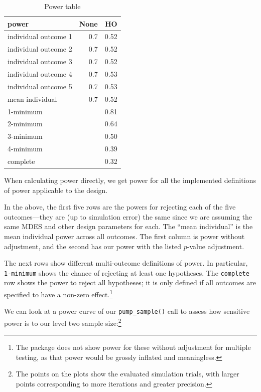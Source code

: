 \documentclass{article}
\begin{document}
\begin{table}[h!]

\caption{\label{tab:unnamed-chunk-7}Power table}
\centering
\begin{tabular}[t]{lrr}
\toprule
power & None & HO\\
\midrule
individual outcome 1 & 0.7 & 0.52\\
individual outcome 2 & 0.7 & 0.52\\
individual outcome 3 & 0.7 & 0.52\\
individual outcome 4 & 0.7 & 0.53\\
individual outcome 5 & 0.7 & 0.53\\
\addlinespace
mean individual & 0.7 & 0.52\\
1-minimum &  & 0.81\\
2-minimum &  & 0.64\\
3-minimum &  & 0.50\\
4-minimum &  & 0.39\\
\addlinespace
complete &  & 0.32\\
\bottomrule
\end{tabular}
\end{table}

When calculating power directly, we get power for all the implemented
definitions of power applicable to the design.

In the above, the first five rows are the powers for rejecting each of
the five outcomes---they are (up to simulation error) the same since we
are assuming the same MDES and other design parameters for each. The
``mean individual'' is the mean individual power across all outcomes.
The first column is power without adjustment, and the second has our
power with the listed \(p\)-value adjustment.

The next rows show different multi-outcome definitions of power. In
particular, \texttt{1-minimum} shows the chance of rejecting at least
one hypotheses. The \texttt{complete} row shows the power to reject all
hypotheses; it is only defined if all outcomes are specified to have a
non-zero effect.\footnote{The package does not show power for these
  without adjustment for multiple testing, as that power would be
  grossly inflated and meaningless.}

We can look at a power curve of our \texttt{pump\_sample()} call to
assess how sensitive power is to our level two sample size:\footnote{The
  points on the plots show the evaluated simulation trials, with larger
  points corresponding to more iterations and greater precision.}
\end{document}
